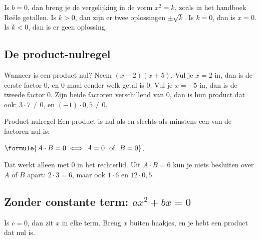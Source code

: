 Is $b = 0$, dan breng je de vergelijking in de vorm $x^2 = k$, zoals in het handboek Reële getallen. Is $k > 0$, dan zijn er twee oplossingen $\pm\sqrt k$. Is $k = 0$, dan is $x = 0$. Is $k < 0$, dan is er geen oplossing.


\subsection{De product-nulregel}

Wanneer is een product nul? Neem $(x - 2)(x + 5)$. Vul je $x = 2$ in, dan is de eerste factor $0$, en $0$ maal eender welk getal is $0$. Vul je $x = -5$ in, dan is de tweede factor $0$. Zijn beide factoren verschillend van $0$, dan is hun product dat ook: $3 \cdot 7 \neq 0$, en $(-1) \cdot 0,5 \neq 0$.

\begin{theorie}
\begin{stelling}{Product-nulregel}
Een product is nul als en slechts als minstens een van de factoren nul is:

\qquad $\formule{A \cdot B = 0 \iff A = 0 \ \text{ of } \ B = 0}$.
\end{stelling}
\end{theorie}

Dat werkt alleen met $0$ in het rechterlid. Uit $A \cdot B = 6$ kun je niets besluiten over $A$ of $B$ apart: $2 \cdot 3 = 6$, maar ook $1 \cdot 6$ en $12 \cdot 0,5$.

\subsection{Zonder constante term: \texorpdfstring{$ax^2 + bx = 0$}{ax² + bx = 0}}

Is $c = 0$, dan zit $x$ in elke term. Breng $x$ buiten haakjes, en je hebt een product dat nul is.


